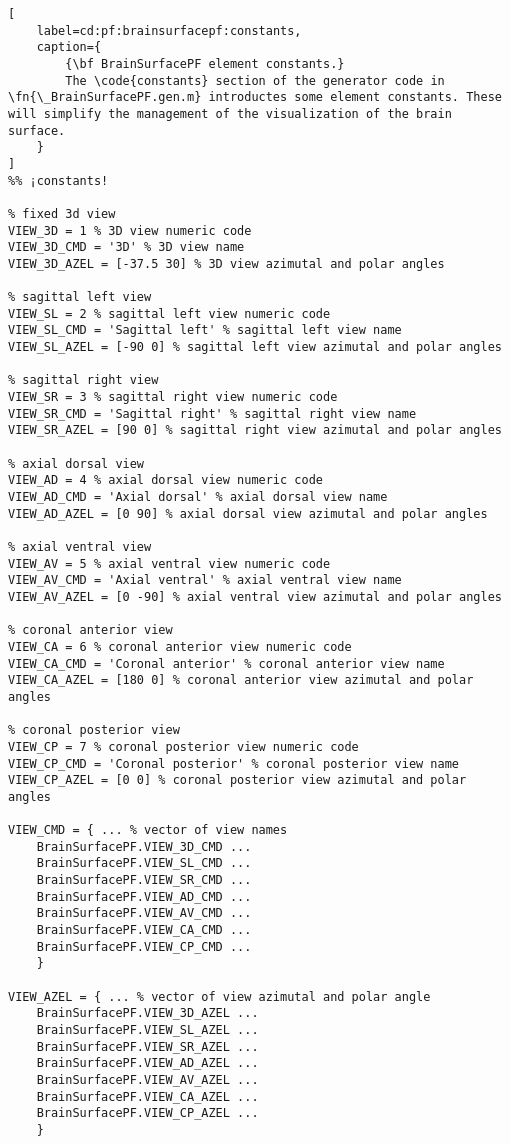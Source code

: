 \documentclass{tufte-handout}
\begin{document}
\begin{lstlisting}[
	label=cd:pf:brainsurfacepf:constants,
	caption={
		{\bf BrainSurfacePF element constants.}
		The \code{constants} section of the generator code in \fn{\_BrainSurfacePF.gen.m} introductes some element constants. These will simplify the management of the visualization of the brain surface.
	}
]
%% ¡constants!

% fixed 3d view
VIEW_3D	= 1 % 3D view numeric code
VIEW_3D_CMD = '3D' % 3D view name
VIEW_3D_AZEL = [-37.5 30] % 3D view azimutal and polar angles

% sagittal left view
VIEW_SL	= 2 % sagittal left view numeric code
VIEW_SL_CMD = 'Sagittal left' % sagittal left view name
VIEW_SL_AZEL = [-90 0] % sagittal left view azimutal and polar angles

% sagittal right view
VIEW_SR	= 3 % sagittal right view numeric code
VIEW_SR_CMD = 'Sagittal right' % sagittal right view name
VIEW_SR_AZEL = [90 0] % sagittal right view azimutal and polar angles 

% axial dorsal view
VIEW_AD = 4 % axial dorsal view numeric code
VIEW_AD_CMD = 'Axial dorsal' % axial dorsal view name
VIEW_AD_AZEL = [0 90] % axial dorsal view azimutal and polar angles

% axial ventral view
VIEW_AV = 5 % axial ventral view numeric code
VIEW_AV_CMD = 'Axial ventral' % axial ventral view name
VIEW_AV_AZEL = [0 -90] % axial ventral view azimutal and polar angles

% coronal anterior view
VIEW_CA = 6 % coronal anterior view numeric code
VIEW_CA_CMD = 'Coronal anterior' % coronal anterior view name
VIEW_CA_AZEL = [180 0] % coronal anterior view azimutal and polar angles

% coronal posterior view
VIEW_CP = 7 % coronal posterior view numeric code
VIEW_CP_CMD = 'Coronal posterior' % coronal posterior view name
VIEW_CP_AZEL = [0 0] % coronal posterior view azimutal and polar angles

VIEW_CMD = { ... % vector of view names
    BrainSurfacePF.VIEW_3D_CMD ...
    BrainSurfacePF.VIEW_SL_CMD ...
    BrainSurfacePF.VIEW_SR_CMD ...
    BrainSurfacePF.VIEW_AD_CMD ...
    BrainSurfacePF.VIEW_AV_CMD ...
    BrainSurfacePF.VIEW_CA_CMD ...
    BrainSurfacePF.VIEW_CP_CMD ...
    }

VIEW_AZEL = { ... % vector of view azimutal and polar angle
    BrainSurfacePF.VIEW_3D_AZEL ...
    BrainSurfacePF.VIEW_SL_AZEL ...
    BrainSurfacePF.VIEW_SR_AZEL ...
    BrainSurfacePF.VIEW_AD_AZEL ...
    BrainSurfacePF.VIEW_AV_AZEL ...
    BrainSurfacePF.VIEW_CA_AZEL ...
    BrainSurfacePF.VIEW_CP_AZEL ...
    }
\end{lstlisting}
\end{document}
